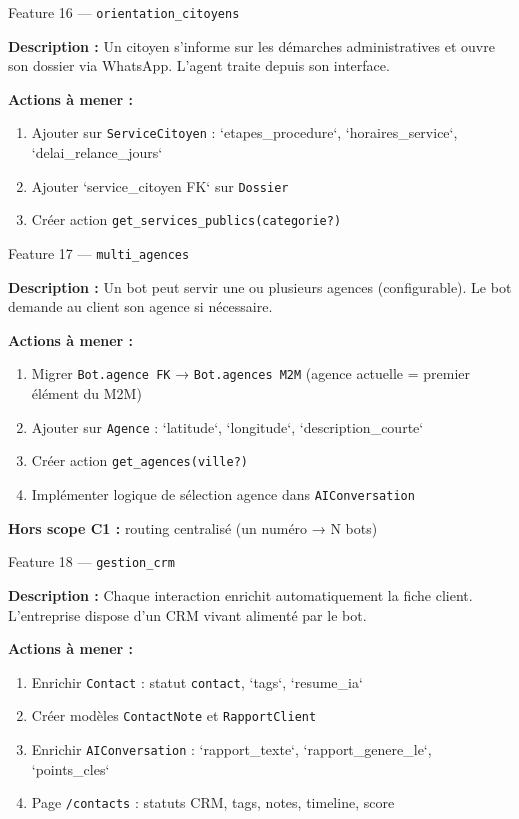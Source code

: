 \documentclass[11pt,a4paper]{article}
\newcommand{\slug}[1]{\texttt{\color{AGTDark}#1}}
\begin{document}
\bigskip

\begin{featurebox}{Feature 16 — \slug{orientation\_citoyens}}

\textbf{Description :} Un citoyen s'informe sur les démarches administratives et
ouvre son dossier via WhatsApp. L'agent traite depuis son interface.

\textbf{Actions à mener :}
\begin{enumerate}
  \item Ajouter sur \slug{ServiceCitoyen} : `etapes\_procedure`, `horaires\_service`,
        `delai\_relance\_jours`
  \item Ajouter `service\_citoyen FK` sur \slug{Dossier}
  \item Créer action \slug{get\_services\_publics(categorie?)}
\end{enumerate}

\end{featurebox}

\bigskip

\begin{featurebox}{Feature 17 — \slug{multi\_agences}}

\textbf{Description :} Un bot peut servir une ou plusieurs agences (configurable).
Le bot demande au client son agence si nécessaire.

\textbf{Actions à mener :}
\begin{enumerate}
  \item Migrer \slug{Bot.agence FK} → \slug{Bot.agences M2M}
        (agence actuelle = premier élément du M2M)
  \item Ajouter sur \slug{Agence} : `latitude`, `longitude`, `description\_courte`
  \item Créer action \slug{get\_agences(ville?)}
  \item Implémenter logique de sélection agence dans \slug{AIConversation}
\end{enumerate}

\textbf{Hors scope C1 :} routing centralisé (un numéro → N bots)

\end{featurebox}

\bigskip

\begin{featurebox}{Feature 18 — \slug{gestion\_crm}}

\textbf{Description :} Chaque interaction enrichit automatiquement la fiche client.
L'entreprise dispose d'un CRM vivant alimenté par le bot.

\textbf{Actions à mener :}
\begin{enumerate}
  \item Enrichir \slug{Contact} : statut \texttt{contact}, `tags`, `resume\_ia`
  \item Créer modèles \slug{ContactNote} et \slug{RapportClient}
  \item Enrichir \slug{AIConversation} : `rapport\_texte`, `rapport\_genere\_le`,
        `points\_cles`
  \item Page \texttt{/contacts} : statuts CRM, tags, notes, timeline, score
\end{enumerate}

\end{featurebox}
\end{document}
